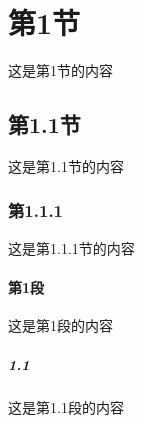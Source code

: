 \documentclass{article}
\begin{document}
\setcounter{tocdepth}{2} %
\tableofcontents  %
\clearpage


\section{第1节}
这是第1节的内容
\subsection{第1.1节}
这是第1.1节的内容
\subsubsection{第1.1.1}
这是第1.1.1节的内容
\paragraph{第1段}
这是第1段的内容
\subparagraph{1.1}
这是第1.1段的内容



\end{document}

